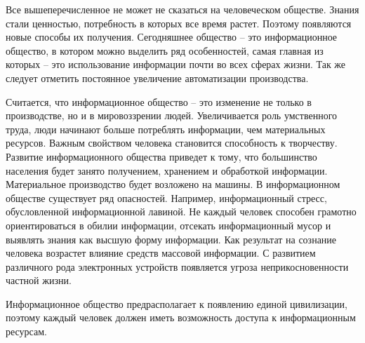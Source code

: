 Все вышеперечисленное не может не сказаться на человеческом обществе. Знания стали ценностью, потребность в которых все время растет. Поэтому появляются новые способы их получения.
Сегодняшнее общество – это информационное общество, в котором можно выделить ряд особенностей, самая главная из которых – это использование информации почти во всех сферах жизни. Так же следует отметить постоянное увеличение автоматизации производства.

Считается, что информационное общество – это изменение не только в производстве, но и в мировоззрении людей. Увеличивается роль умственного труда, люди начинают больше потреблять информации, чем материальных ресурсов. Важным свойством человека становится способность к творчеству. Развитие информационного общества приведет к тому, что большинство населения будет занято получением, хранением и обработкой информации. Материальное производство будет возложено на машины.
В информационном обществе существует ряд опасностей. Например, информационный стресс, обусловленной информационной лавиной. Не каждый человек способен грамотно ориентироваться в обилии информации, отсекать информационный мусор и выявлять знания как высшую форму информации. Как результат на сознание человека возрастет влияние средств массовой информации. С развитием различного рода электронных устройств появляется угроза неприкосновенности частной жизни.

Информационное общество предрасполагает к появлению единой цивилизации, поэтому каждый человек должен иметь возможность доступа к информационным ресурсам.

